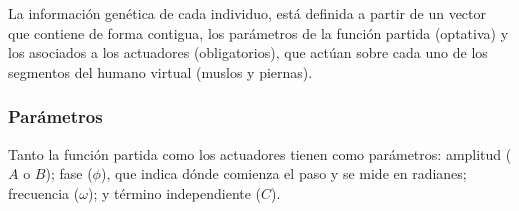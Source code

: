 \documentclass{article}
\begin{document}
La informaci\'on gen\'etica de cada individuo, est\'a definida a partir de un vector que contiene de forma contigua, los par\'ametros de la funci\'on partida (optativa) y los asociados a los actuadores (obligatorios), que act\'uan sobre cada uno de los segmentos del humano virtual (muslos y piernas).  

\subsubsection{Par\'ametros}
\label{sub:parametros}
Tanto la funci\'on partida como los actuadores tienen como par\'ametros: amplitud ($A$ o $B$); fase ($\phi$), que indica d\'onde comienza el paso y se mide en radianes; frecuencia ($\omega$); y t\'ermino independiente ($C$).\\
\end{document}
